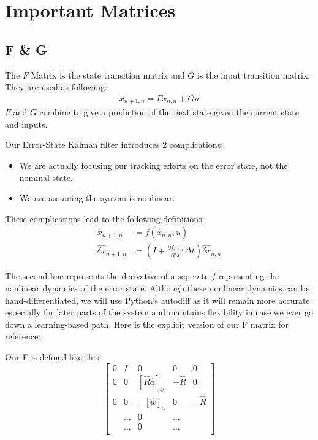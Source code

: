 \documentclass{article}
\begin{document}
\section{Important Matrices}

\subsection{F \& G}
The $F$ Matrix is the state transition matrix and $G$ is the input transition matrix. They are used as following:
\begin{align}
    x_{n+1,n} = Fx_{n,n} + Gu
\end{align}
$F$ and $G$ combine to give a prediction of the next state given the current state and inputs.

Our Error-State Kalman filter introduces 2 complications:
\begin{itemize}
    \item We are actually focusing our tracking efforts on the error state, not the nominal state.
    \item We are assuming the system is nonlinear.
\end{itemize}

These complications lead to the following definitions:
\begin{align}
    \widehat{x}_{n+1,n} &= f(\widehat{x}_{n,n}, u) \\
    \widehat{\delta x}_{n+1, n} &= (I + \frac{\partial f_{error}}{\partial \delta x} \Delta t) \widehat{\delta x}_{n,n}
\end{align}

The second line represents the derivative of a seperate $f$ representing the nonlinear dynamics of the error state. Although these nonlinear dynamics can be hand-differentiated, we will use Python's autodiff as it will remain more accurate especially for later parts of the system and maintains flexibility in case we ever go down a learning-based path. Here is the explicit version of our F matrix for reference:

Our F is defined like this:
\[
\begin{bmatrix}
    0 & I & 0 & 0 & 0\\
    0 & 0 & [\hat{R} \hat{a}]_x & -\hat{R} & 0 \\
    0 & 0 & -[\hat{w}]_x & 0 & -\hat{R} \\
    &\dots &0& \dots \\
    &\dots &0& \dots \\
\end{bmatrix}
\]
\end{document}

